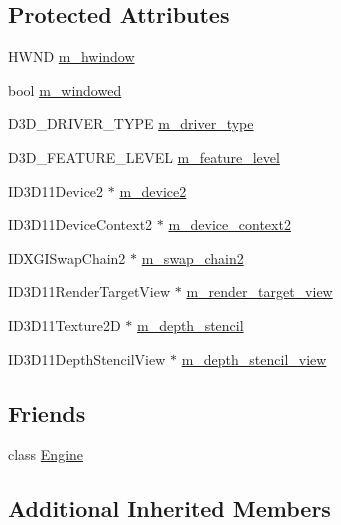 \subsection*{Protected Attributes}
\begin{DoxyCompactItemize}
\item 
H\+W\+ND \hyperlink{classmage_1_1_renderer_afc314c8b146c3709edfd5349257a8387}{m\+\_\+hwindow}
\item 
bool \hyperlink{classmage_1_1_renderer_a9215a05e35d22294adb87084422b98cd}{m\+\_\+windowed}
\item 
D3\+D\+\_\+\+D\+R\+I\+V\+E\+R\+\_\+\+T\+Y\+PE \hyperlink{classmage_1_1_renderer_ae7ff3dd640a2319d1d263bd9ba657076}{m\+\_\+driver\+\_\+type}
\item 
D3\+D\+\_\+\+F\+E\+A\+T\+U\+R\+E\+\_\+\+L\+E\+V\+EL \hyperlink{classmage_1_1_renderer_aa97b108ef58f7d41ddb527f6ba2bfdf9}{m\+\_\+feature\+\_\+level}
\item 
I\+D3\+D11\+Device2 $\ast$ \hyperlink{classmage_1_1_renderer_a5af9d44e53bd523136cc52855a2dbe25}{m\+\_\+device2}
\item 
I\+D3\+D11\+Device\+Context2 $\ast$ \hyperlink{classmage_1_1_renderer_a57bee762f1a8c0ca13c62874a4297f48}{m\+\_\+device\+\_\+context2}
\item 
I\+D\+X\+G\+I\+Swap\+Chain2 $\ast$ \hyperlink{classmage_1_1_renderer_a64eb8b31f6835322d13e1d9b8ea9e113}{m\+\_\+swap\+\_\+chain2}
\item 
I\+D3\+D11\+Render\+Target\+View $\ast$ \hyperlink{classmage_1_1_renderer_a60eeb3b440c2c8a027b583ab93830d73}{m\+\_\+render\+\_\+target\+\_\+view}
\item 
I\+D3\+D11\+Texture2D $\ast$ \hyperlink{classmage_1_1_renderer_a1c19b2fb0347ab2e93f19d7a9d53a947}{m\+\_\+depth\+\_\+stencil}
\item 
I\+D3\+D11\+Depth\+Stencil\+View $\ast$ \hyperlink{classmage_1_1_renderer_a85b04ce9e3d0086c499910b2df82876d}{m\+\_\+depth\+\_\+stencil\+\_\+view}
\end{DoxyCompactItemize}
\subsection*{Friends}
\begin{DoxyCompactItemize}
\item 
class \hyperlink{classmage_1_1_renderer_a3e1914489e4bed4f9f23cdeab34a43dc}{Engine}
\end{DoxyCompactItemize}
\subsection*{Additional Inherited Members}


